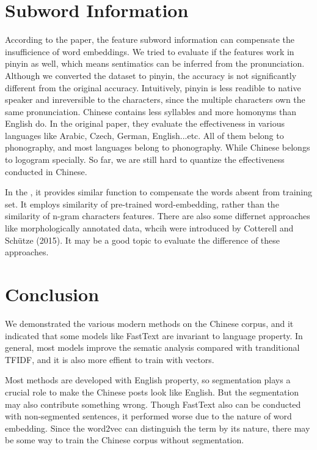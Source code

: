 \section{Subword Information}

According to the paper, the feature subword information can compensate the insufficience of word embeddings. 
We tried to evaluate if the features work in pinyin as well, which means sentimatics can be inferred from the pronunciation. 
Although we converted the dataset to pinyin, the accuracy is not significantly different from the original accuracy. 
Intuitively, pinyin is less readible to native speaker and inreversible to the characters, since the multiple characters own the same pronunciation. 
Chinese contains less syllables and more homonyms than English do. In the original paper\cite{bojanowski2016enriching}, they evaluate the effectiveness in various languages like Arabic, Czech, German, English...etc.
All of them belong to phonography, and most languages belong to phonography. While Chinese belongs to logogram specially. So far, we are still hard to quantize the effectiveness conducted in Chinese.

In the \cite{DBLP:journals/corr/MikolovLS13}, it provides similar function to compensate the words absent from training set. 
It employs similarity of pre-trained word-embedding, rather than the similarity of n-gram characters features. 
There are also some differnet approaches like morphologically annotated data, whcih were introduced by Cotterell and Schütze (2015).
It may be a good topic to evaluate the difference of these approaches. 

\section{Conclusion}

We demonstrated the various modern methods on the Chinese corpus, and it indicated that some models like FastText are invariant to language property. 
In general, most models improve the sematic analysis compared with tranditional TFIDF, and it is also more effient to train with vectors.

Most methods are developed with English property, so segmentation plays a crucial role to make the Chinese posts look like English.
 But the segmentation may also contribute something wrong. Though FastText also can be conducted with non-segmented sentences, it performed worse due to the nature of word embedding.
Since the word2vec can distinguish the term by its nature, there may be some way to train the Chinese corpus without segmentation.

